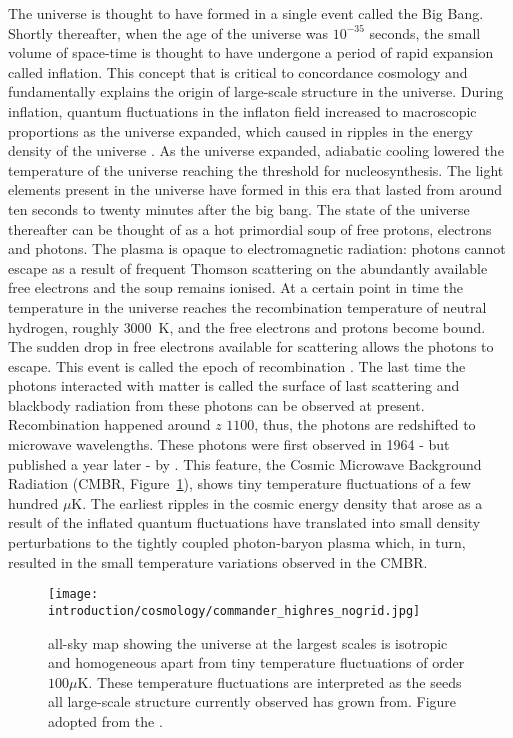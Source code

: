 \documentclass[MScProj_TLRH_ClusterEnergy.tex]{subfiles}
\begin{document}
The universe is thought to have formed in a single event called the Big Bang.
Shortly thereafter, when the age of the universe was \mytilde $10^{-35}$ seconds, 
the small volume of space-time is thought to have undergone a period of rapid 
expansion called inflation. This concept that is critical to concordance cosmology
and fundamentally explains the origin of large-scale structure in the universe. 
During inflation, quantum fluctuations in the inflaton field increased to 
macroscopic proportions as the universe expanded, which caused in ripples in the energy
density of the universe \citep{1981PhRvD..23..347G}. As the universe expanded, 
adiabatic cooling lowered the temperature of the universe reaching the threshold
for nucleosynthesis. The light elements present in the universe have formed in
this era that lasted from around ten seconds to twenty minutes after the big bang.
The state of the universe thereafter can be thought of as a hot primordial soup of free
protons, electrons and photons. The plasma is opaque to electromagnetic radiation:
photons cannot escape as a result of frequent Thomson scattering on the abundantly 
available free electrons and the soup remains ionised. At a certain point in 
time the temperature in the universe reaches the recombination temperature of neutral
hydrogen, roughly $3000$~K, and the free electrons and protons
become bound. The sudden drop in free electrons available for scattering allows 
the photons to escape. This event is called the epoch of recombination 
\citep{1968ApJ...153....1P, 1969JETP...28..146Z, 2000ApJS..128..407S}.
The last time the photons interacted with matter is called the surface of last 
scattering and blackbody radiation from these photons can be observed at present.
Recombination happened around $z$ \mytilde $1100$, thus, the photons are redshifted
to microwave wavelengths. These photons were first observed in 1964 - but published
a year later - by \citet{1965ApJ...142..419P}. This feature, the Cosmic Microwave
Background Radiation (CMBR, Figure~\ref{fig:CMBR}), shows tiny temperature fluctuations of 
a few hundred $\mu$K. The earliest ripples in the cosmic energy density that arose
as a result of the inflated quantum fluctuations have translated into small density
perturbations to the tightly coupled photon-baryon plasma \citep{1970ApJ...162..815P} 
which, in turn, resulted in the small temperature variations observed in the CMBR.

\begin{figure}
\centering
\texttt{[image: introduction/cosmology/commander\_highres\_nogrid.jpg]}
\caption{ all-sky map showing the universe at the largest scales 
         is isotropic and homogeneous apart from tiny temperature fluctuations of order
         $100 \mu$K. These temperature fluctuations are interpreted as the seeds
         all large-scale structure currently observed has grown from.
         Figure adopted from the \citet{2015arXiv150201582P}.}
         \label{fig:CMBR}
\end{figure}
\end{document}
